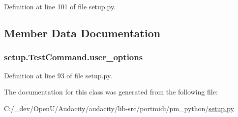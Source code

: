 Definition at line 101 of file setup.\+py.



\subsection{Member Data Documentation}
\subsubsection[{\texorpdfstring{user\+\_\+options}{user_options}}]{\setlength{\rightskip}{0pt plus 5cm}setup.\+Test\+Command.\+user\+\_\+options\hspace{0.3cm}{\ttfamily [static]}}\hypertarget{classsetup_1_1_test_command_af93f4307f9c9c86d8f81b44030052022}{}\label{classsetup_1_1_test_command_af93f4307f9c9c86d8f81b44030052022}


Definition at line 93 of file setup.\+py.



The documentation for this class was generated from the following file\+:\begin{DoxyCompactItemize}
\item 
C\+:/\+\_\+dev/\+Open\+U/\+Audacity/audacity/lib-\/src/portmidi/pm\+\_\+python/\hyperlink{setup_8py}{setup.\+py}\end{DoxyCompactItemize}
